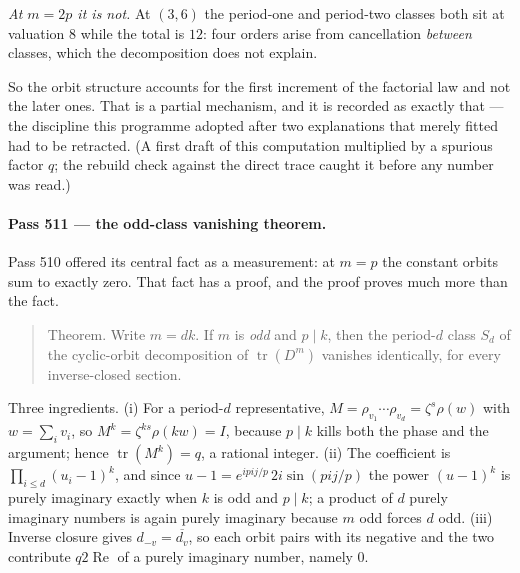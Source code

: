 \documentclass[12pt,a4paper]{article}
\def\mathrm#1{#1}%
\def\textbf#1{#1}%
\def\pi{pi}%
\def\cdot{ }%
\theoremstyle{definition}
\begin{document}
\emph{At $m=2p$ it is not.}  At $(3,6)$ the period-one and period-two classes
both sit at valuation $8$ while the total is $12$: four orders arise from
cancellation \emph{between} classes, which the decomposition does not explain.

So the orbit structure accounts for the first increment of the factorial law
and not the later ones.  That is a partial mechanism, and it is recorded as
exactly that --- the discipline this programme adopted after two explanations
that merely fitted had to be retracted.  (A first draft of this computation
multiplied by a spurious factor $q$; the rebuild check against the direct trace
caught it before any number was read.)

\paragraph{Pass 511 --- the odd-class vanishing theorem.}
Pass 510 offered its central fact as a measurement: at $m=p$ the constant
orbits sum to exactly zero.  That fact has a proof, and the proof proves much
more than the fact.

\begin{quote}
\textbf{Theorem.}  Write $m=dk$.  If $m$ is \emph{odd} and $p\mid k$, then the
period-$d$ class $S_d$ of the cyclic-orbit decomposition of
$\operatorname{tr}(D^m)$ vanishes identically, for every inverse-closed
section.
\end{quote}

\noindent Three ingredients.  (i) For a period-$d$ representative,
$M=\rho_{v_1}\cdots\rho_{v_d}=\zeta^{s}\rho(w)$ with $w=\sum_i v_i$, so
$M^{k}=\zeta^{ks}\rho(kw)=I$, because $p\mid k$ kills both the phase and the
argument; hence $\operatorname{tr}(M^k)=q$, a rational integer.  (ii) The
coefficient is $\prod_{i\le d}(u_i-1)^{k}$, and since
$u-1=e^{\mathrm{i}\pi j/p}\,2\mathrm{i}\sin(\pi j/p)$ the power $(u-1)^k$ is
purely imaginary exactly when $k$ is odd and $p\mid k$; a product of $d$ purely
imaginary numbers is again purely imaginary because $m$ odd forces $d$ odd.
(iii) Inverse closure gives $d_{-v}=\overline{d_v}$, so each orbit pairs with
its negative and the two contribute $q\cdot2\operatorname{Re}$ of a purely
imaginary number, namely $0$.
\end{document}
